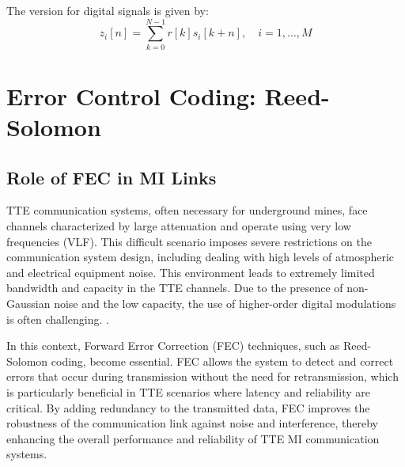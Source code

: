 The version for digital signals is given by:
\begin{equation}
    \label{eq:Correlation_dig}
    z_i[n] = \sum_{k=0}^{N-1} r[k]s_i[k+n], \quad i=1, \dots, M
\end{equation}




\section{Error Control Coding: Reed-Solomon}\label{sec:error-control-coding}


\subsection{Role of FEC in MI Links}

TTE communication systems, often necessary for underground mines, face channels characterized by large attenuation and operate using very low frequencies (VLF). This difficult scenario imposes severe restrictions on the communication system design, including dealing with high levels of atmospheric and electrical equipment noise. This environment leads to extremely limited bandwidth and capacity in the TTE channels. Due to the presence of non-Gaussian noise and the low capacity, the use of higher-order digital modulations is often challenging. \cite{ma2025survey}.

In this context, Forward Error Correction (FEC) techniques, such as Reed-Solomon coding, become essential. FEC allows the system to detect and correct errors that occur during transmission without the need for retransmission, which is particularly beneficial in TTE scenarios where latency and reliability are critical. By adding redundancy to the transmitted data, FEC improves the robustness of the communication link against noise and interference, thereby enhancing the overall performance and reliability of TTE MI communication systems.


